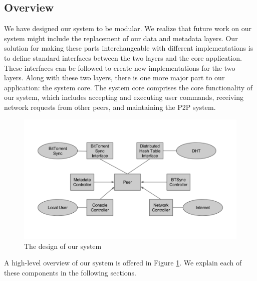 \documentclass[12pt]{report}
\begin{document}
\subsection{Overview} \label{subsec:Overview_sec:SystemDesign_chap:Implementation}
We have designed our system to be modular. We realize that future work on our system might include the replacement of our data and metadata layers. Our solution for making these parts interchangeable with different implementations is to define standard interfaces between the two layers and the core application. These interfaces can be followed to create new implementations for the two layers. Along with these two layers, there is one more major part to our application: the system core. The system core comprises the core functionality of our system, which includes accepting and executing user commands, receiving network requests from other peers, and maintaining the P2P system.

\begin{figure}
  \centering
  \includegraphics[scale=0.4]{figures/SystemDesign}
  \caption{The design of our system \label{fig:SystemDesign}}
\end{figure}

A high-level overview of our system is offered in Figure \ref{fig:SystemDesign}. We explain each of these components in the following sections.
\end{document}
